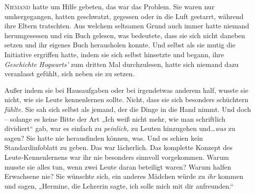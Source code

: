 \lettrine{N}{iemand} hatte um Hilfe gebeten, das war das Problem. Sie waren nur umhergegangen, hatten geschwatzt, gegessen oder in die Luft gestarrt, während ihre Eltern tratschten. Aus welchem seltsamen Grund auch immer hatte niemand herumgesessen und ein Buch gelesen, was bedeutete, dass sie sich nicht daneben setzen und ihr eigenes Buch herausholen konnte. Und selbst als sie mutig die Initiative ergriffen hatte, indem sie sich selbst hinsetzte und begann, ihre \emph{Geschichte Hogwarts’} zum dritten Mal durchzulesen, hatte sich niemand dazu veranlasst gefühlt, sich neben sie zu setzen.

Außer indem sie bei Hausaufgaben oder bei irgendetwas anderem half, wusste sie nicht, wie sie Leute kennenlernen sollte. Nicht, dass sie sich besonders schüchtern \emph{fühlte.} Sie sah sich selbst als jemand, der die Dinge in die Hand nimmt. Und doch – solange es keine Bitte der Art „Ich weiß nicht mehr, wie man schriftlich dividiert“ gab, war es einfach zu \emph{peinlich,} zu Leuten hinzugehen und…\emph{was} zu sagen? Sie hatte nie herausfinden können, was. Und es schien kein Standardinfoblatt zu geben. Das war lächerlich. Das komplette Konzept des Leute-Kennenlernens war ihr nie besonders sinnvoll vorgekommen. Warum musste sie alles tun, wenn zwei Leute daran beteiligt waren? Warum halfen Erwachsene nie? Sie wünschte sich, ein anderes Mädchen würde zu \emph{ihr} kommen und sagen, „Hermine, die Lehrerin sagte, ich solle mich mit dir anfreunden.“


